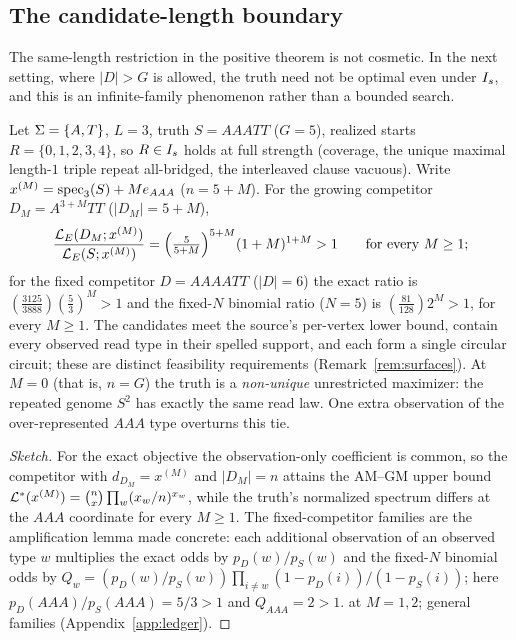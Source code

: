 \subsection{The candidate-length boundary}
\label{sec:finite:length}

The same-length restriction in the positive theorem is not cosmetic. In the next
setting, where $|D|>G$ is allowed, the truth need not be optimal even under $I_s$,
and this is an infinite-family phenomenon rather than a bounded search.

\begin{theorem}
\label{thm:cex-variable-length}
Let $\Sigma=\{A,T\}$, $L=3$, truth $S=AAATT$ ($G=5$), realized starts
$R=\{0,1,2,3,4\}$, so $R\in I_s$ holds at full strength (coverage, the unique
maximal length-$1$ triple repeat all-bridged, the interleaved clause vacuous).
Write $x^{(M)}=\operatorname{spec}_3(S)+M e_{AAA}$ ($n=5+M$). For the growing competitor
$D_M=A^{3+M}TT$ ($|D_M|=5+M$),
\[
  \frac{\mathcal{L}_E(D_M;x^{(M)})}{\mathcal{L}_E(S;x^{(M)})}
    = \Bigl(\tfrac{5}{5+M}\Bigr)^{5+M}(1+M)^{1+M} > 1
  \qquad\text{for every } M\ge 1 ;
\]
for the fixed competitor $D=AAAATT$ ($|D|=6$) the exact ratio is
$(\tfrac{3125}{3888})(\tfrac53)^M>1$ and the fixed-$N$ binomial ratio
($N=5$) is $(\tfrac{81}{128})2^M>1$, for every $M\ge 1$. The candidates meet the source's per-vertex lower bound,
contain every observed read type in their spelled support,
and each form a single circular circuit; these are distinct
feasibility requirements (Remark~\ref{rem:surfaces}). At $M=0$ (that is, $n=G$) the truth is a \emph{non-unique}
unrestricted maximizer: the repeated genome $S^2$ has exactly
the same read law. One extra observation of the over-represented
$AAA$ type overturns this tie.
\end{theorem}

\begin{proof}[Sketch]
For the exact objective the observation-only coefficient is common, so the
competitor with $d_{D_M}=x^{(M)}$ and $|D_M|=n$ attains the AM--GM upper bound
$\mathcal{L}^*(x^{(M)})=\binom{n}{x}\prod_w(x_w/n)^{x_w}$, while the truth's normalized
spectrum differs at the $AAA$ coordinate for every $M\ge1$. The fixed-competitor
families are the amplification lemma made concrete: each additional observation
of an observed type $w$ multiplies the exact odds by
$p_D(w)/p_S(w)$ and the fixed-$N$ binomial odds by
$Q_w=(p_D(w)/p_S(w))\prod_{i\ne w}(1-p_D(i))/(1-p_S(i))$; here
$p_D(AAA)/p_S(AAA)=5/3>1$ and $Q_{AAA}=2>1$.
 at $M=1,2$; general families \mathfact{} (Appendix~\ref{app:ledger}).
\end{proof}

